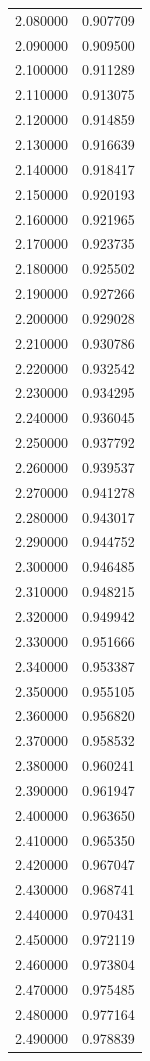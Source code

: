 \begin{tabular}{rr}
2.080000 & 0.907709 \\
2.090000 & 0.909500 \\
2.100000 & 0.911289 \\
2.110000 & 0.913075 \\
2.120000 & 0.914859 \\
2.130000 & 0.916639 \\
2.140000 & 0.918417 \\
2.150000 & 0.920193 \\
2.160000 & 0.921965 \\
2.170000 & 0.923735 \\
2.180000 & 0.925502 \\
2.190000 & 0.927266 \\
2.200000 & 0.929028 \\
2.210000 & 0.930786 \\
2.220000 & 0.932542 \\
2.230000 & 0.934295 \\
2.240000 & 0.936045 \\
2.250000 & 0.937792 \\
2.260000 & 0.939537 \\
2.270000 & 0.941278 \\
2.280000 & 0.943017 \\
2.290000 & 0.944752 \\
2.300000 & 0.946485 \\
2.310000 & 0.948215 \\
2.320000 & 0.949942 \\
2.330000 & 0.951666 \\
2.340000 & 0.953387 \\
2.350000 & 0.955105 \\
2.360000 & 0.956820 \\
2.370000 & 0.958532 \\
2.380000 & 0.960241 \\
2.390000 & 0.961947 \\
2.400000 & 0.963650 \\
2.410000 & 0.965350 \\
2.420000 & 0.967047 \\
2.430000 & 0.968741 \\
2.440000 & 0.970431 \\
2.450000 & 0.972119 \\
2.460000 & 0.973804 \\
2.470000 & 0.975485 \\
2.480000 & 0.977164 \\
2.490000 & 0.978839 \\

\end{tabular}
